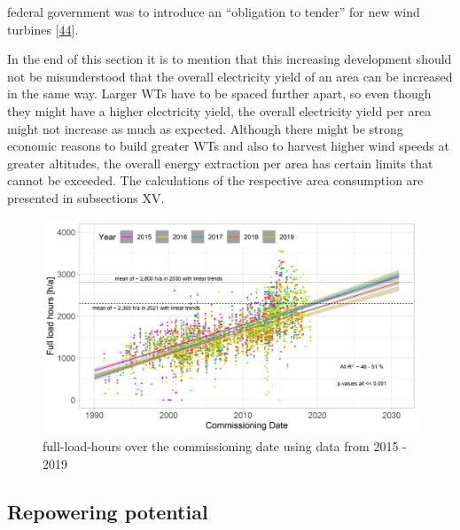 \documentclass[a4paper,11pt]{article}
\begin{document}
federal government was to introduce an ``obligation to tender'' for new wind turbines {[}\protect\hyperlink{ref-NickSchader.2021}{44}{]}.

In the end of this section it is to mention that this increasing development should not be misunderstood that the overall electricity yield of an area can be increased in the same way. Larger WTs have to be spaced further apart, so even though they might have a higher electricity yield, the overall electricity yield per area might not increase as much as expected. Although there might be strong economic reasons to build greater WTs and also to harvest higher wind speeds at greater altitudes, the overall energy extraction per area has certain limits that cannot be exceeded. The calculations of the respective area consumption are presented in subsections XV.
\begin{figure}[H]

{\centering \includegraphics[width=1\linewidth]{data/Amprion/results_of_analysis/flh} 

}

\caption{full-load-hours over the commissioning date using data from 2015 - 2019}\label{fig:full}
\end{figure}
\hypertarget{repowering-potential}{%
\subsection{Repowering potential}\label{repowering-potential}}
\end{document}
